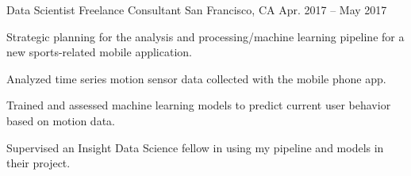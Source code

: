 \begin{cventries}
  \cventry
    {Data Scientist} %
    {Freelance Consultant} %
    {San Francisco, CA} %
    {Apr. 2017 -- May 2017} %
    {
      \begin{cvitems} %
        \item {Strategic planning for the analysis and processing/machine learning pipeline for a new sports-related mobile application.} %
        \item {Analyzed time series motion sensor data collected with the mobile phone app.}
        \item {Trained and assessed machine learning models to predict current user behavior based on motion data.}
        \item {Supervised an Insight Data Science fellow in using my pipeline and models in their project.} %
     \end{cvitems}
    }



\end{cventries}
